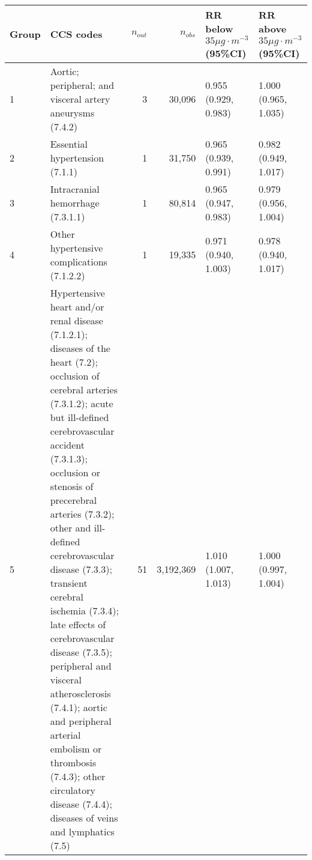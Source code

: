 \begin{tabular}{lp{6.5cm}rrp{2.2cm}p{2.2cm}}
  \hline
Group & CCS codes & $n_{out}$ & $n_{obs}$ & RR below $35 \mu g \cdot m^{-3}$ (95\%CI) & RR above $35 \mu g \cdot m^{-3}$ (95\%CI) \\ 
  \hline
   1 & Aortic; peripheral; and visceral artery aneurysms (7.4.2) &    3 & 30,096 & 0.955 (0.929, 0.983) & 1.000 (0.965, 1.035) \\ 
     2 & Essential hypertension (7.1.1) &    1 & 31,750 & 0.965 (0.939, 0.991) & 0.982 (0.949, 1.017) \\ 
     3 & Intracranial hemorrhage (7.3.1.1) &    1 & 80,814 & 0.965 (0.947, 0.983) & 0.979 (0.956, 1.004) \\ 
     4 & Other hypertensive complications (7.1.2.2) &    1 & 19,335 & 0.971 (0.940, 1.003) & 0.978 (0.940, 1.017) \\ 
     5 & Hypertensive heart and/or renal disease (7.1.2.1); diseases of the heart (7.2); occlusion of cerebral arteries (7.3.1.2); acute but ill-defined cerebrovascular accident (7.3.1.3); occlusion or stenosis of precerebral arteries (7.3.2); other and ill-defined cerebrovascular disease (7.3.3); transient cerebral ischemia (7.3.4); late effects of cerebrovascular disease (7.3.5); peripheral and visceral atherosclerosis (7.4.1); aortic and peripheral arterial embolism or thrombosis (7.4.3); other circulatory disease (7.4.4); diseases of veins and lymphatics (7.5) &   51 & 3,192,369 & 1.010 (1.007, 1.013) & 1.000 (0.997, 1.004) \\ 
   \hline
\end{tabular}

